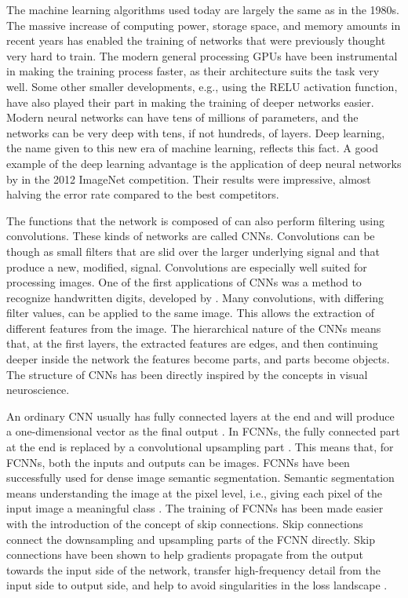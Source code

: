 The machine learning algorithms used today are largely the same as in the 1980s. The massive increase of computing power, storage space, and memory amounts in recent years has enabled the training of networks that were previously thought very hard to train. The modern general processing \acp{GPU} have been instrumental in making the training process faster, as their architecture suits the task very well. Some other smaller developments, e.g., using the \ac{RELU} activation function, have also played their part in making the training of deeper networks easier. Modern neural networks can have tens of millions of parameters, and the networks can be very deep with tens, if not hundreds, of layers. Deep learning, the name given to this new era of machine learning, reflects this fact. A good example of the deep learning advantage is the application of deep neural networks by \textcite{Krizhevsky2012} in the 2012 ImageNet competition. Their results were impressive, almost halving the error rate compared to the best competitors. \cite{Goodfellow2016,LeCun2015}

The functions that the network is composed of can also perform filtering using convolutions. These kinds of networks are called \acfp{CNN}. Convolutions can be though as small filters that are slid over the larger underlying signal and that produce a new, modified, signal. Convolutions are especially well suited for processing images. One of the first applications of \acp{CNN} was a method to recognize handwritten digits, developed by \textcite{Lecun1998}. Many convolutions, with differing filter values, can be applied to the same image. This allows the extraction of different features from the image. The hierarchical nature of the \acp{CNN} means that, at the first layers, the extracted features are edges, and then continuing deeper inside the network the features become parts, and parts become objects. The structure of \acp{CNN} has been directly inspired by the concepts in visual neuroscience. \cite{Goodfellow2016,LeCun2015}

An ordinary \ac{CNN} usually has fully connected layers at the end and will produce a one-dimensional vector as the final output \cite{Lecun1998}. In \acfp{FCNN}, the fully connected part at the end is replaced by a convolutional upsampling part \cite{Long2015}. This means that, for \acp{FCNN}, both the inputs and outputs can be images. \acp{FCNN} have been successfully used for dense image semantic segmentation. Semantic segmentation means understanding the image at the pixel level, i.e., giving each pixel of the input image a meaningful class \cite{Long2015,Ronneberger2015}. The training of \acp{FCNN} has been made easier with the introduction of the concept of skip connections. Skip connections connect the downsampling and upsampling parts of the \ac{FCNN} directly. Skip connections have been shown to help gradients propagate from the output towards the input side of the network, transfer high-frequency detail from the input side to output side, and help to avoid singularities in the loss landscape \cite{Ronneberger2015,Orhan2017,Goodfellow2016}.

